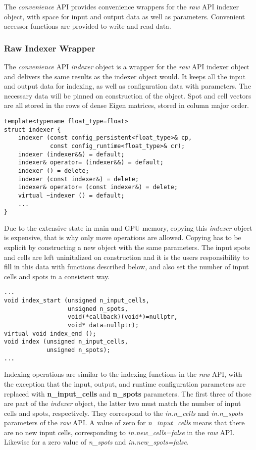 \documentclass[a4paper,10pt]{article}
\begin{document}
The \emph{convenience} API provides convenience wrappers for the \emph{raw} API indexer object, with space for input and output data as well as parameters. Convenient accessor functions are provided to write and read data.

\subsubsection{Raw Indexer Wrapper}

The \emph{convenience} API \emph{indexer} object is a wrapper for the \emph{raw} API indexer object and delivers the same results as the indexer object would. It keeps all the input and output data for indexing, as well as configuration data with parameters. The necessary data will be pinned on construction of the object. Spot and cell vectors are all stored in the rows of dense Eigen matrices, stored in column major order.
%
\begin{lstlisting}
template<typename float_type=float>
struct indexer {
    indexer (const config_persistent<float_type>& cp,
             const config_runtime<float_type>& cr);
    indexer (indexer&&) = default;
    indexer& operator= (indexer&&) = default;
    indexer () = delete;
    indexer (const indexer&) = delete;
    indexer& operator= (const indexer&) = delete;
    virtual ~indexer () = default;
    ...
}
\end{lstlisting}
%
Due to the extensive state in main and GPU memory, copying this \emph{indexer} object is expensive, that is why only move operations are allowed. Copying has to be explicit by constructing a new object with the same parameters. The input spots and cells are left uninitalized on construction and it is the users responsibility to fill in this data with functions described below, and also set the number of input cells and spots in a consistent way.
%
\begin{lstlisting}
...
void index_start (unsigned n_input_cells,
                  unsigned n_spots,
                  void(*callback)(void*)=nullptr,
                  void* data=nullptr);
virtual void index_end ();
void index (unsigned n_input_cells,
            unsigned n_spots);
...
\end{lstlisting}
%
Indexing operations are similar to the indexing functions in the \emph{raw} API, with the exception that the input, output, and runtime configuration parameters are replaced with \textbf{n\_input\_cells} and \textbf{n\_spots} parameters. The first three of those are part of the \emph{indexer} object, the latter two must match the number of input cells and spots, respectively. They correspond to the \emph{in.n\_cells} and \emph{in.n\_spots} parameters of the \emph{raw} API. A value of zero for \emph{n\_input\_cells} means that there are no new input cells, corresponding to \emph{in.new\_cells=false} in the \emph{raw} API. Likewise for a zero value of \emph{n\_spots} and \emph{in.new\_spots=false}.
\end{document}
